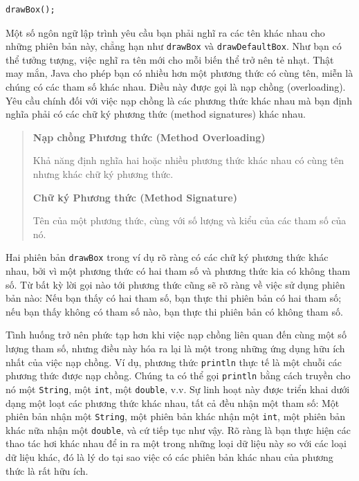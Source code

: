 \begin{verbatim}
drawBox();
\end{verbatim}

Một số ngôn ngữ lập trình yêu cầu bạn phải nghĩ ra các tên khác nhau cho
những phiên bản này, chẳng hạn như \texttt{drawBox} và
\texttt{drawDefaultBox}. Như bạn có thể tưởng tượng, việc nghĩ ra tên
mới cho mỗi biến thể trở nên tẻ nhạt. Thật may mắn, Java cho phép bạn có
nhiều hơn một phương thức có cùng tên, miễn là chúng có các tham số khác
nhau. Điều này được gọi là nạp chồng (overloading). Yêu cầu chính đối
với việc nạp chồng là các phương thức khác nhau mà bạn định nghĩa phải
có các chữ ký phương thức (method signatures) khác nhau.

\begin{quote}
\textbf{Nạp chồng Phương thức (Method Overloading)}

Khả năng định nghĩa hai hoặc nhiều phương thức khác nhau có cùng tên
nhưng khác chữ ký phương thức.

\textbf{Chữ ký Phương thức (Method Signature)}

Tên của một phương thức, cùng với số lượng và kiểu của các tham số của
nó.
\end{quote}

Hai phiên bản \texttt{drawBox} trong ví dụ rõ ràng có các chữ ký phương
thức khác nhau, bởi vì một phương thức có hai tham số và phương thức kia
có không tham số. Từ bất kỳ lời gọi nào tới phương thức cũng sẽ rõ ràng
về việc sử dụng phiên bản nào: Nếu bạn thấy có hai tham số, bạn thực thi
phiên bản có hai tham số; nếu bạn thấy không có tham số nào, bạn thực
thi phiên bản có không tham số.

Tình huống trở nên phức tạp hơn khi việc nạp chồng liên quan đến cùng
một số lượng tham số, nhưng điều này hóa ra lại là một trong những ứng
dụng hữu ích nhất của việc nạp chồng. Ví dụ, phương thức
\texttt{println} thực tế là một chuỗi các phương thức được nạp chồng.
Chúng ta có thể gọi \texttt{println} bằng cách truyền cho nó một
\texttt{String}, một \texttt{int}, một \texttt{double}, v.v. Sự linh
hoạt này được triển khai dưới dạng một loạt các phương thức khác nhau,
tất cả đều nhận một tham số: Một phiên bản nhận một \texttt{String}, một
phiên bản khác nhận một \texttt{int}, một phiên bản khác nữa nhận một
\texttt{double}, và cứ tiếp tục như vậy. Rõ ràng là bạn thực hiện các
thao tác hơi khác nhau để in ra một trong những loại dữ liệu này so với
các loại dữ liệu khác, đó là lý do tại sao việc có các phiên bản khác
nhau của phương thức là rất hữu ích.

